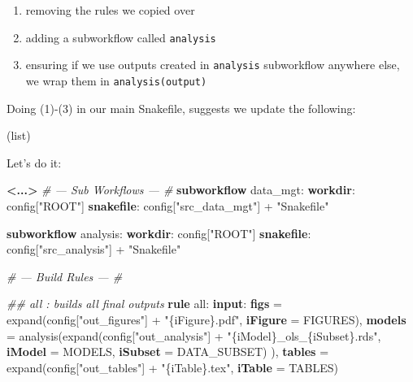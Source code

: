 \documentclass[]{book}
\newenvironment{Shaded}{\begin{snugshade}}{\end{snugshade}}
\newcommand{\KeywordTok}[1]{\textcolor[rgb]{0.13,0.29,0.53}{\textbf{{#1}}}}
\newcommand{\StringTok}[1]{\textcolor[rgb]{0.31,0.60,0.02}{{#1}}}
\newcommand{\CommentTok}[1]{\textcolor[rgb]{0.56,0.35,0.01}{\textit{{#1}}}}
\newcommand{\NormalTok}[1]{{#1}}
\providecommand{\tightlist}{%
  \setlength{\itemsep}{0pt}\setlength{\parskip}{0pt}}
\theoremstyle{definition}
\theoremstyle{definition}
\theoremstyle{definition}
\theoremstyle{remark}
\begin{document}
\begin{enumerate}
\def\labelenumi{\arabic{enumi}.}
\tightlist
\item
  removing the rules we copied over
\item
  adding a subworkflow called \texttt{analysis}
\item
  ensuring if we use outputs created in \texttt{analysis} subworkflow
  anywhere else, we wrap them in \texttt{analysis(output)}
\end{enumerate}

Doing (1)-(3) in our main Snakefile, suggests we update the following:

(list)

Let's do it:

\begin{Shaded}
\begin{Highlighting}[]
\KeywordTok{<...>}
\CommentTok{# --- Sub Workflows --- #}
\KeywordTok{subworkflow} \NormalTok{data_mgt:}
   \KeywordTok{workdir}\NormalTok{: config[}\StringTok{"ROOT"}\NormalTok{]}
   \KeywordTok{snakefile}\NormalTok{:  config[}\StringTok{"src_data_mgt"}\NormalTok{] + }\StringTok{"Snakefile"}

\KeywordTok{subworkflow} \NormalTok{analysis:}
   \KeywordTok{workdir}\NormalTok{: config[}\StringTok{"ROOT"}\NormalTok{]}
   \KeywordTok{snakefile}\NormalTok{:  config[}\StringTok{"src_analysis"}\NormalTok{] + }\StringTok{"Snakefile"}

\CommentTok{# --- Build Rules --- #}

\CommentTok{## all                : builds all final outputs}
\KeywordTok{rule} \NormalTok{all:}
    \KeywordTok{input}\NormalTok{:}
        \KeywordTok{figs}   \NormalTok{= expand(config[}\StringTok{"out_figures"}\NormalTok{] + }\StringTok{"\{iFigure\}.pdf"}\NormalTok{,}
                            \KeywordTok{iFigure} \NormalTok{= FIGURES),}
        \KeywordTok{models} \NormalTok{= analysis(expand(config[}\StringTok{"out_analysis"}\NormalTok{] +}
                            \StringTok{"\{iModel\}_ols_\{iSubset\}.rds"}\NormalTok{,}
                            \KeywordTok{iModel} \NormalTok{= MODELS,}
                            \KeywordTok{iSubset} \NormalTok{= DATA_SUBSET)}
                            \NormalTok{),}
        \KeywordTok{tables}  \NormalTok{= expand(config[}\StringTok{"out_tables"}\NormalTok{] + }\StringTok{"\{iTable\}.tex"}\NormalTok{,}
                            \KeywordTok{iTable} \NormalTok{= TABLES)}


\end{Highlighting}
\end{Shaded}
\end{document}
